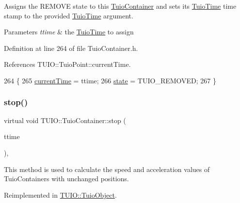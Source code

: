 Assigns the R\+E\+M\+O\+VE state to this \hyperlink{class_t_u_i_o_1_1_tuio_container}{Tuio\+Container} and sets its \hyperlink{class_t_u_i_o_1_1_tuio_time}{Tuio\+Time} time stamp to the provided \hyperlink{class_t_u_i_o_1_1_tuio_time}{Tuio\+Time} argument.


\begin{DoxyParams}{Parameters}
{\em ttime} & the \hyperlink{class_t_u_i_o_1_1_tuio_time}{Tuio\+Time} to assign \\
\hline
\end{DoxyParams}


Definition at line 264 of file Tuio\+Container.\+h.



References T\+U\+I\+O\+::\+Tuio\+Point\+::current\+Time.


\begin{DoxyCode}
264                                             \{
265             \hyperlink{class_t_u_i_o_1_1_tuio_point_ad04658d52ab78e3e0ddc21584ceaa2ff}{currentTime} = ttime;
266             \hyperlink{class_t_u_i_o_1_1_tuio_container_a61cfc66997d3d2f2a503e20bd29ddbf1}{state} = TUIO\_REMOVED;
267         \}
\end{DoxyCode}
\mbox{\label{class_t_u_i_o_1_1_tuio_container_a250b4a7c140178c3585aa5b957b34d73}} 
\subsubsection{\texorpdfstring{stop()}{stop()}}
{\footnotesize\ttfamily virtual void T\+U\+I\+O\+::\+Tuio\+Container\+::stop (\begin{DoxyParamCaption}\item[{\hyperlink{class_t_u_i_o_1_1_tuio_time}{Tuio\+Time}}]{ttime }\end{DoxyParamCaption})\hspace{0.3cm}{\ttfamily [inline]}, {\ttfamily [virtual]}}

This method is used to calculate the speed and acceleration values of Tuio\+Containers with unchanged positions. 

Reimplemented in \hyperlink{class_t_u_i_o_1_1_tuio_object_a4b30f602dc66829d9c23a7a19a8ae9fa}{T\+U\+I\+O\+::\+Tuio\+Object}.



